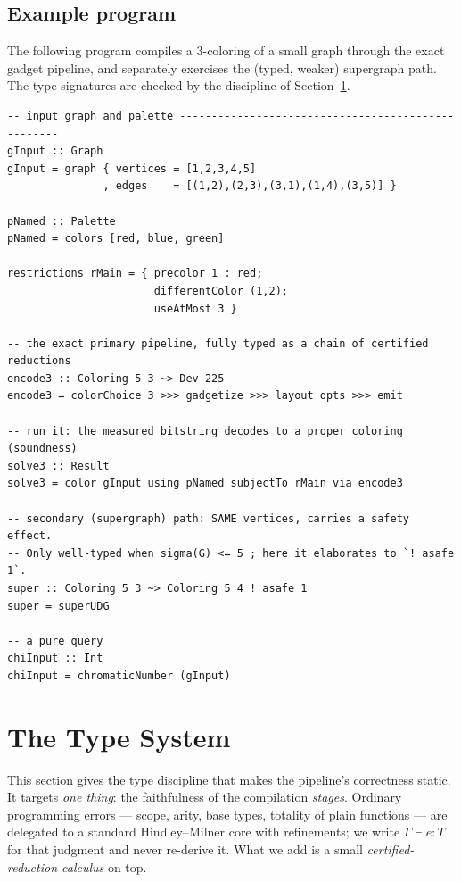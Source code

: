 \documentclass[11pt]{article}
\theoremstyle{definition}
\theoremstyle{remark}
\begin{document}
\subsection{Example program}
\label{sec:langexample}

The following program compiles a $3$-coloring of a small graph through the exact gadget
pipeline, and separately exercises the (typed, weaker) supergraph path. The type
signatures are checked by the discipline of Section~\ref{sec:types}.

\begin{lstlisting}[style=lang]
-- input graph and palette ---------------------------------------------------
gInput :: Graph
gInput = graph { vertices = [1,2,3,4,5]
               , edges    = [(1,2),(2,3),(3,1),(1,4),(3,5)] }

pNamed :: Palette
pNamed = colors [red, blue, green]

restrictions rMain = { precolor 1 : red;
                       differentColor (1,2);
                       useAtMost 3 }

-- the exact primary pipeline, fully typed as a chain of certified reductions
encode3 :: Coloring 5 3 ~> Dev 225
encode3 = colorChoice 3 >>> gadgetize >>> layout opts >>> emit

-- run it: the measured bitstring decodes to a proper coloring (soundness)
solve3 :: Result
solve3 = color gInput using pNamed subjectTo rMain via encode3

-- secondary (supergraph) path: SAME vertices, carries a safety effect.
-- Only well-typed when sigma(G) <= 5 ; here it elaborates to `! asafe 1`.
super :: Coloring 5 3 ~> Coloring 5 4 ! asafe 1
super = superUDG

-- a pure query
chiInput :: Int
chiInput = chromaticNumber (gInput)
\end{lstlisting}

\section{The Type System}
\label{sec:types}

This section gives the type discipline that makes the pipeline's correctness static. It
targets \emph{one thing}: the faithfulness of the compilation \emph{stages}. Ordinary
programming errors --- scope, arity, base types, totality of plain functions --- are
delegated to a standard Hindley--Milner core with refinements; we write
$\Gamma\vdash e:T$ for that judgment and never re-derive it. What we add is a small
\emph{certified-reduction calculus} on top.
\end{document}
